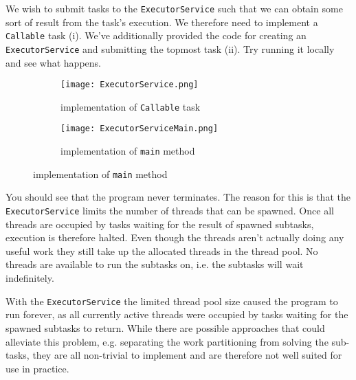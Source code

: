\documentclass[main.tex]{subfiles}
\begin{document}
\begin{example}
\label{ex:ES_Div&Conq}
    We wish to submit tasks to the \texttt{ExecutorService} such that we can obtain some sort of result from the task's execution. We therefore need to implement a \texttt{Callable} task (i). We've additionally provided the code for creating an \texttt{ExecutorService} and submitting the topmost task (ii). Try running it locally and see what happens. 
    \begin{figure}[H]
        \centering
        \begin{subfigure}{.5\textwidth}
            \centering
            \texttt{[image: ExecutorService.png]}
            \caption{implementation of \texttt{Callable} task}
        \end{subfigure}%
        \begin{subfigure}{.5\textwidth}
            \centering
            \texttt{[image: ExecutorServiceMain.png]}
            \caption{implementation of \texttt{main} method}
        \end{subfigure}
    \end{figure}
    \noindent You should see that the program never terminates. The reason for this is that the \texttt{ExecutorService} limits the number of threads that can be spawned. Once all threads are occupied by tasks waiting for the result of spawned subtasks, execution is therefore halted. Even though the threads aren't actually doing any useful work they still take up the allocated threads in the thread pool. No threads are available to run the subtasks on, i.e. the subtasks will wait indefinitely.
\end{example}
With the \texttt{ExecutorService} the limited thread pool size caused the program to run forever, as all currently active threads were occupied by tasks waiting for the spawned subtasks to return. While there are possible approaches that could alleviate this problem, e.g. separating the work partitioning from solving the sub-tasks, they are all non-trivial to implement and are therefore not well suited for use in practice.

\end{document}
